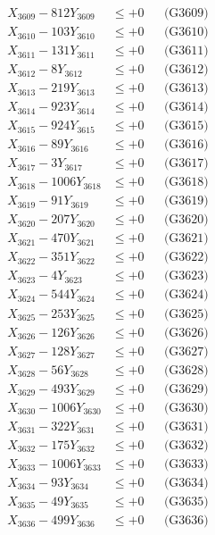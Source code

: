 \documentclass[a4paper,10pt]{article}
\begin{document}
{\begin{align}
X_{3609} - 812Y_{3609} &\leq +0 && \text{(G3609)} \\
X_{3610} - 103Y_{3610} &\leq +0 && \text{(G3610)} \\
\allowbreak
X_{3611} - 131Y_{3611} &\leq +0 && \text{(G3611)} \\
X_{3612} - 8Y_{3612} &\leq +0 && \text{(G3612)} \\
X_{3613} - 219Y_{3613} &\leq +0 && \text{(G3613)} \\
X_{3614} - 923Y_{3614} &\leq +0 && \text{(G3614)} \\
X_{3615} - 924Y_{3615} &\leq +0 && \text{(G3615)} \\
X_{3616} - 89Y_{3616} &\leq +0 && \text{(G3616)} \\
X_{3617} - 3Y_{3617} &\leq +0 && \text{(G3617)} \\
X_{3618} - 1006Y_{3618} &\leq +0 && \text{(G3618)} \\
X_{3619} - 91Y_{3619} &\leq +0 && \text{(G3619)} \\
X_{3620} - 207Y_{3620} &\leq +0 && \text{(G3620)} \\
\allowbreak
X_{3621} - 470Y_{3621} &\leq +0 && \text{(G3621)} \\
X_{3622} - 351Y_{3622} &\leq +0 && \text{(G3622)} \\
X_{3623} - 4Y_{3623} &\leq +0 && \text{(G3623)} \\
X_{3624} - 544Y_{3624} &\leq +0 && \text{(G3624)} \\
X_{3625} - 253Y_{3625} &\leq +0 && \text{(G3625)} \\
X_{3626} - 126Y_{3626} &\leq +0 && \text{(G3626)} \\
X_{3627} - 128Y_{3627} &\leq +0 && \text{(G3627)} \\
X_{3628} - 56Y_{3628} &\leq +0 && \text{(G3628)} \\
X_{3629} - 493Y_{3629} &\leq +0 && \text{(G3629)} \\
X_{3630} - 1006Y_{3630} &\leq +0 && \text{(G3630)} \\
\allowbreak
X_{3631} - 322Y_{3631} &\leq +0 && \text{(G3631)} \\
X_{3632} - 175Y_{3632} &\leq +0 && \text{(G3632)} \\
X_{3633} - 1006Y_{3633} &\leq +0 && \text{(G3633)} \\
X_{3634} - 93Y_{3634} &\leq +0 && \text{(G3634)} \\
X_{3635} - 49Y_{3635} &\leq +0 && \text{(G3635)} \\
X_{3636} - 499Y_{3636} &\leq +0 && \text{(G3636)} \\

\end{align}}
\end{document}

